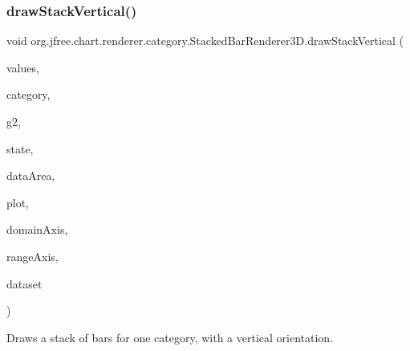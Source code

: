 \subsubsection{\texorpdfstring{draw\+Stack\+Vertical()}{drawStackVertical()}}
{\footnotesize\ttfamily void org.\+jfree.\+chart.\+renderer.\+category.\+Stacked\+Bar\+Renderer3\+D.\+draw\+Stack\+Vertical (\begin{DoxyParamCaption}\item[{List}]{values,  }\item[{Comparable}]{category,  }\item[{Graphics2D}]{g2,  }\item[{\mbox{\hyperlink{classorg_1_1jfree_1_1chart_1_1renderer_1_1category_1_1_category_item_renderer_state}{Category\+Item\+Renderer\+State}}}]{state,  }\item[{Rectangle2D}]{data\+Area,  }\item[{\mbox{\hyperlink{classorg_1_1jfree_1_1chart_1_1plot_1_1_category_plot}{Category\+Plot}}}]{plot,  }\item[{\mbox{\hyperlink{classorg_1_1jfree_1_1chart_1_1axis_1_1_category_axis}{Category\+Axis}}}]{domain\+Axis,  }\item[{\mbox{\hyperlink{classorg_1_1jfree_1_1chart_1_1axis_1_1_value_axis}{Value\+Axis}}}]{range\+Axis,  }\item[{\mbox{\hyperlink{interfaceorg_1_1jfree_1_1data_1_1category_1_1_category_dataset}{Category\+Dataset}}}]{dataset }\end{DoxyParamCaption})\hspace{0.3cm}{\ttfamily [protected]}}

Draws a stack of bars for one category, with a vertical orientation.


